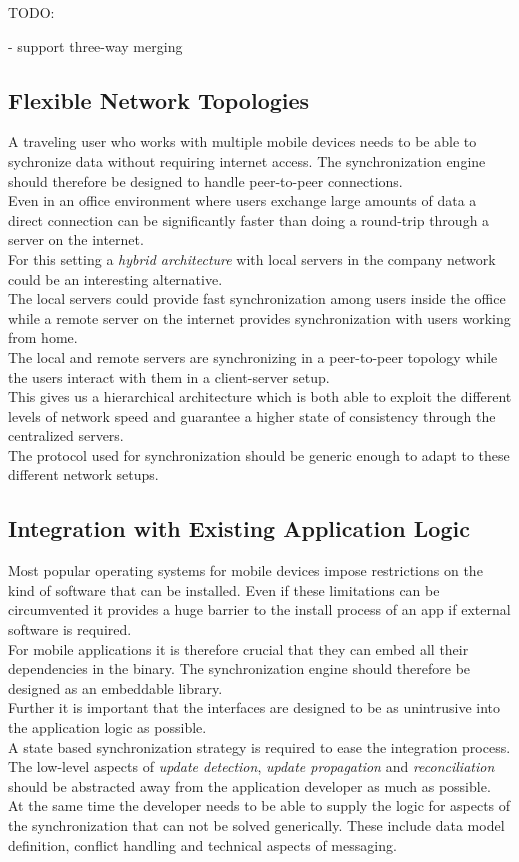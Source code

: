TODO:

- support three-way merging

\subsection{Flexible Network Topologies}
A traveling user who works with multiple mobile devices needs to be able to sychronize data without requiring internet access.
The synchronization engine should therefore be designed to handle peer-to-peer connections.\\
Even in an office environment where users exchange large amounts of data a direct connection can be significantly faster than doing a round-trip through a server on the internet.\\
For this setting a \emph{hybrid architecture} with local servers in the company network could be an interesting alternative.\\
The local servers could provide fast synchronization among users inside the office while a remote server on the internet provides synchronization with users working from home.\\
The local and remote servers are synchronizing in a peer-to-peer topology while the users interact with them in a client-server setup.\\
This gives us a hierarchical architecture which is both able to exploit the different levels of network speed and guarantee a higher state of consistency through the centralized servers.\\

The protocol used for synchronization should be generic enough to adapt to these different network setups.

\subsection{Integration with Existing Application Logic}
Most popular operating systems for mobile devices impose restrictions on the kind of software that can be installed.
Even if these limitations can be circumvented it provides a huge barrier to the install process of an app if external software is required.\\
For mobile applications it is therefore crucial that they can embed all their dependencies in the binary.
The synchronization engine should therefore be designed as an embeddable library.\\
Further it is important that the interfaces are designed to be as unintrusive into the application logic as possible.\\

A state based synchronization strategy is required to ease the integration process. The low-level aspects of \emph{update detection}, \emph{update propagation} and \emph{reconciliation} should be abstracted away from the application developer as much as possible.\\
At the same time the developer needs to be able to supply the logic for aspects of the synchronization that can not be solved generically. These include data model definition, conflict handling and technical aspects of messaging.